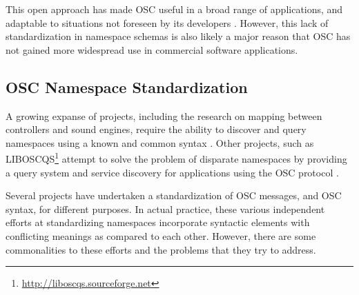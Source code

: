 \documentclass{NIME-alternate}
\begin{document}

%

This open approach has made OSC useful in a broad range of applications, and adaptable to situations not foreseen by its developers \cite{Wright:2005}.  However, this lack of standardization in namespace schemas is also likely a major reason that OSC has not gained more widespread use in commercial software applications.



\subsection{OSC Namespace Standardization} %
\label{sub:namespace_standardization}

A growing expanse of projects, including the research on mapping between controllers and sound engines, require the ability to discover and query namespaces using a known and common syntax \cite{Malloch:2007}. Other projects, such as LIBOSCQS\footnote{\url{http://liboscqs.sourceforge.net}} attempt to solve the problem of disparate namespaces by providing a query system and service discovery for applications using the OSC protocol \cite{Habets:2005, Schmeder:2004oscqs}.



Several projects have undertaken a standardization of OSC messages, and OSC syntax, for different purposes. In actual practice, these various independent efforts at standardizing namespaces incorporate syntactic elements with conflicting meanings as compared to each other. However, there are some commonalities to these efforts and the problems that they try to address.
\end{document}
